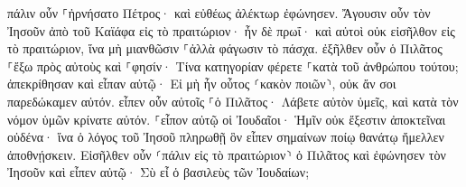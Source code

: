 \documentclass{openreader}
\begin{document}
πάλιν οὖν ⸀ἠρνήσατο Πέτρος· καὶ εὐθέως ἀλέκτωρ ἐφώνησεν. 
Ἄγουσιν οὖν τὸν Ἰησοῦν ἀπὸ τοῦ Καϊάφα εἰς τὸ πραιτώριον· ἦν δὲ πρωΐ· καὶ αὐτοὶ οὐκ εἰσῆλθον εἰς τὸ πραιτώριον, ἵνα μὴ μιανθῶσιν ⸀ἀλλὰ φάγωσιν τὸ πάσχα. 
ἐξῆλθεν οὖν ὁ Πιλᾶτος ⸀ἔξω πρὸς αὐτοὺς καὶ ⸀φησίν· Τίνα κατηγορίαν φέρετε ⸀κατὰ τοῦ ἀνθρώπου τούτου; 
ἀπεκρίθησαν καὶ εἶπαν αὐτῷ· Εἰ μὴ ἦν οὗτος ⸂κακὸν ποιῶν⸃, οὐκ ἄν σοι παρεδώκαμεν αὐτόν. 
εἶπεν οὖν αὐτοῖς ⸀ὁ Πιλᾶτος· Λάβετε αὐτὸν ὑμεῖς, καὶ κατὰ τὸν νόμον ὑμῶν κρίνατε αὐτόν. ⸀εἶπον αὐτῷ οἱ Ἰουδαῖοι· Ἡμῖν οὐκ ἔξεστιν ἀποκτεῖναι οὐδένα· 
ἵνα ὁ λόγος τοῦ Ἰησοῦ πληρωθῇ ὃν εἶπεν σημαίνων ποίῳ θανάτῳ ἤμελλεν ἀποθνῄσκειν. 
Εἰσῆλθεν οὖν ⸂πάλιν εἰς τὸ πραιτώριον⸃ ὁ Πιλᾶτος καὶ ἐφώνησεν τὸν Ἰησοῦν καὶ εἶπεν αὐτῷ· Σὺ εἶ ὁ βασιλεὺς τῶν Ἰουδαίων; 
\end{document}

